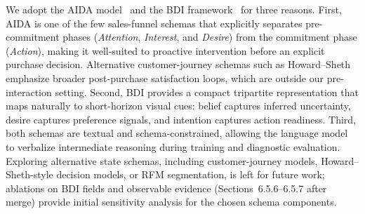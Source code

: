 
We adopt the AIDA model~\cite{barry1987development} and the BDI framework~\cite{rao1995bdi} for three reasons. First, AIDA is one of the few sales-funnel schemas that explicitly separates pre-commitment phases (\emph{Attention}, \emph{Interest}, and \emph{Desire}) from the commitment phase (\emph{Action}), making it well-suited to proactive intervention before an explicit purchase decision. Alternative customer-journey schemas such as Howard--Sheth emphasize broader post-purchase satisfaction loops, which are outside our pre-interaction setting. Second, BDI provides a compact tripartite representation that maps naturally to short-horizon visual cues: belief captures inferred uncertainty, desire captures preference signals, and intention captures action readiness. Third, both schemas are textual and schema-constrained, allowing the language model to verbalize intermediate reasoning during training and diagnostic evaluation. Exploring alternative state schemas, including customer-journey models, Howard--Sheth-style decision models, or RFM segmentation, is left for future work; ablations on BDI fields and observable evidence (Sections~6.5.6--6.5.7 after merge) provide initial sensitivity analysis for the chosen schema components.

